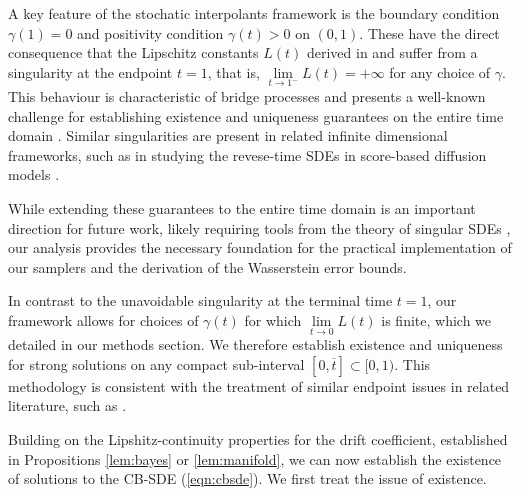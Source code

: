 
\begin{remark}
  A key feature of the stochatic interpolants framework is the boundary condition \(\gamma(1) = 0\) and positivity condition \(\gamma(t) > 0\) on \((0, 1)\). These have the direct consequence that the Lipschitz constants \(L(t)\) derived in  and  suffer from a singularity at the endpoint \(t =1\), that is, \(\lim\limits_{t \to 1^{-}} L(t) = +\infty\) for any choice of \(\gamma\). This behaviour is characteristic of bridge processes and presents a well-known challenge for establishing existence and uniqueness guarantees on the entire time domain \citep[see, e.g.,][]{li2016generalised}. Similar singularities are present in related infinite dimensional frameworks, such as in studying the revese-time SDEs in score-based diffusion models \citep[Theorem 12]{pidstrigach2023infinite}.

  While extending these guarantees to the entire time domain is an important direction for future work, likely requiring tools from the theory of singular SDEs \citep[see, e.g.,][]{cherny2005singular,flandoli2010well,hairer2014theory}, our analysis provides the necessary foundation for the practical implementation of our samplers and the derivation of the Wasserstein error bounds.

  In contrast to the unavoidable singularity at the terminal time \(t=1\), our framework allows for choices of \(\gamma(t)\) for which \(\lim\limits_{t \to 0} L(t)\) is finite, which we detailed in our methods section. We therefore establish existence and uniqueness for strong solutions on any compact sub-interval \([0, \overline{t}] \subset [0, 1)\). This methodology is consistent with the treatment of similar endpoint issues in related literature, such as \citet{pidstrigach2023infinite}.
\end{remark}

Building on  the  Lipshitz-continuity properties for the drift coefficient, established in Propositions \ref{lem:bayes} or \ref{lem:manifold}, we can now establish the existence of solutions to the CB-SDE (\ref{eqn:cbsde}). We first treat the issue of existence.

